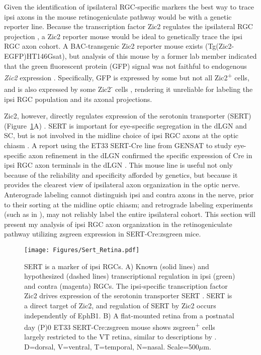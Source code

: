 \label{sec:SertCreResults}
Given the identification of ipsilateral RGC-specific markers the best way to trace ipsi axons in the mouse retinogeniculate pathway would be with a genetic reporter line.
Because the transcription factor Zic2 regulates the ipsilateral RGC projection \cite{herrera2003zic2,williams2003ephrin}, a Zic2 reporter mouse would be ideal to genetically trace the ipsi RGC axon cohort.
A BAC-transgenic Zic2 reporter mouse exists (Tg(Zic2-EGFP)HT146Gsat), but analysis of this mouse by a former lab member indicated that the green fluorescent protein (GFP) signal was not faithful to endogenous \emph{Zic2} expression \cite{wang2013neuronal,marcucci2016ciliary}.
Specifically, GFP is expressed by some but not all Zic2\textsuperscript{+} cells, and is also expressed by some Zic2\textsuperscript{-} cells \cite{wang2013neuronal}, rendering it unreliable for labeling the ipsi RGC population and its axonal projections.

Zic2, however, directly regulates expression of the serotonin transporter (SERT) (Figure~\ref{Figures/SertRetina}A) \cite{garcia2010zic2}.
SERT is important for eye-specific segregation in the dLGN and SC, but is not involved in the midline choice of ipsi RGC axons at the optic chiasm \cite{upton1999excess,salichon2001excessive,garcia2010zic2}.
A report using the ET33 SERT-Cre line from GENSAT to study eye-specific axon refinement in the dLGN confirmed the specific expression of Cre in ipsi RGC axon terminals in the dLGN \cite{koch2011pathway}.
This mouse line is useful not only because of the reliability and specificity afforded by genetics, but because it provides the clearest view of ipsilateral axon organization in the optic nerve.
Anterograde labeling cannot distinguish ipsi and contra axons in the nerve, prior to their sorting at the midline optic chiasm; and retrograde labeling experiments (such as in ), may not reliably label the entire ipsilateral cohort.
This section will present my analysis of ipsi RGC axon organization in the retinogeniculate pathway utilizing zsgreen expression in SERT-Cre:zsgreen mice.

\begin{figure}[hbtp]
    \begin{center}
        \texttt{[image: Figures/Sert\_Retina.pdf]}
        \caption[SERT is a marker of ipsi RGCs.]
        {SERT is a marker of ipsi RGCs.
        A) Known (solid lines) and hypothesized (dashed lines) transcriptional regulation in ipsi (green) and contra (magenta) RGCs.
        The ipsi-specific transcription factor Zic2 drives expression of the serotonin transporter SERT \cite{garcia2010zic2}.
        SERT is a direct target of Zic2, and regulation of SERT by Zic2 occurs independently of EphB1.
        B) A flat-mounted retina from a postnatal day (P)0 ET33 SERT-Cre:zsgreen mouse shows zsgreen\textsuperscript{+} cells largely restricted to the VT retina, similar to descriptions by .
        D=dorsal, V=ventral, T=temporal, N=nasal.
        Scale=500$\mu$m.}
        \label{Figures/SertRetina}
    \end{center}
\end{figure}

